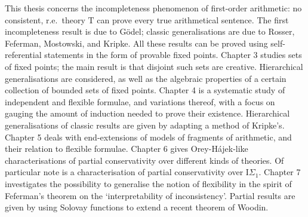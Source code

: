 \documentclass[paper=148mm:209mm,twoside,pagesize=pdftex]{scrartcl}
\begin{document}
\noindent This thesis concerns the incompleteness phenomenon of first-order arithmetic: no consistent, r.e.\ theory $\mathrm{T}$ can prove every true arithmetical sentence. The first incompleteness result is due to Gödel; classic generalisations are due to Rosser, Feferman, Mostowski, and Kripke. All these results can be proved using self-referential statements in the form of provable fixed points.
Chapter 3 studies sets of fixed points; the main result is that disjoint such sets are creative. Hierarchical generalisations are considered, as well as the algebraic properties of a certain collection of bounded sets of fixed points.
Chapter 4 is a systematic study of independent and flexible formulae, and variations thereof, with a focus on gauging the amount of induction needed to prove their existence. Hierarchical generalisations of classic results are given by adapting a method of Kripke's.
Chapter 5 deals with end-extensions of models of fragments of arithmetic, and their \mbox{relation} to flexible formulae.
Chapter 6 gives Orey-H\'{a}jek-like characterisations of partial conservativity over different kinds of theories. Of particular note is a characterisation of partial conservativity over $\mathrm{I}\Sigma_1$.
Chapter 7 investigates the possibility to generalise the notion of flexibility in the spirit of Feferman's theorem on the `interpretability of inconsistency'. Partial results are given by using Solovay functions to extend a recent theorem of Woodin.
\end{document}
